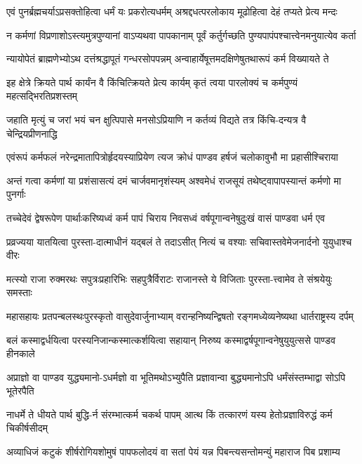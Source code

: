 \twolineshloka
{एवं पुनर्ब्रह्मचर्याऽप्रसक्तोहित्वा धर्मं यः प्रकरोत्यधर्मम्}
{अश्रद्दधत्परलोकाय मूढोहित्वा देहं तप्यते प्रेत्य मन्दः}


\twolineshloka
{न कर्मणां विप्रणाशोऽस्त्यमुत्रपुण्यानां वाऽप्यथवा पापकानाम्}
{पूर्वं कर्तुर्गच्छति पुण्यपापंपश्चात्त्वेनमनुयात्येव कर्ता}


\twolineshloka
{न्यायोपेतं ब्राह्मणेभ्योऽथ दत्तंश्रद्धापूतं गन्धरसोपपन्नम्}
{अन्वाहार्येषूत्तमदक्षिणेषुतथारूपं कर्म विख्यायते ते}


\twolineshloka
{इह क्षेत्रे क्रियते पार्थ कार्यंन वै किंचित्क्रियते प्रेत्य कार्यम्}
{कृतं त्वया पारलोक्यं च कर्मपुण्यं महत्सद्भिरतिप्रशस्तम्}


\twolineshloka
{जहाति मृत्युं च जरां भयं चन क्षुत्पिपासे मनसोऽप्रियाणि}
{न कर्तव्यं विद्यते तत्र किंचि-दन्यत्र वै चेन्द्रियप्रीणनाद्धि}


\twolineshloka
{एवंरूपं कर्मफलं नरेन्द्रमातापित्रोर्हृदयस्याप्रियेण}
{त्यज क्रोधं पाण्डव हर्षजं चलोकावुभौ मा प्रहासीश्चिराया}


\twolineshloka
{अन्तं गत्वा कर्मणां या प्रशंसासत्यं दमं चार्जवमानृशंस्यम्}
{अश्वमेधं राजसूयं तथेष्ट्वापापस्यान्तं कर्मणो मा पुनर्गाः}


\twolineshloka
{तच्चेदेवं द्वेषरूपेण पार्थाःकरिष्यध्वं कर्म पापं चिराय}
{निवसध्वं वर्षपूगान्वनेषुदुःखं वासं पाण्डवा धर्म एव}


\twolineshloka
{प्रव्रज्यया यातयित्वा पुरस्ता-दात्माधीनं यद्बलं ते तदाऽसीत्}
{नित्यं च वश्याः सचिवास्तवेमेजनार्दनो युयुधाश्च वीरः}


\twolineshloka
{मत्स्यो राजा रुक्मरथः सपुत्रःप्रहारिभिः सहपुत्रैर्विराटः}
{राजानस्ते ये विजिताः पुरस्ता-त्त्वामेव ते संश्रयेयुः समस्ताः}


\twolineshloka
{महासहायः प्रतपन्बलस्थःपुरस्कृतो वासुदेवार्जुनाभ्याम्}
{वरान्हनिष्यन्द्विषतो रङ्गमध्येव्यनेष्यथा धार्तराष्ट्रस्य दर्पम्}


\twolineshloka
{बलं कस्माद्वर्धयित्वा परस्यनिजान्कस्मात्कर्शयित्वा सहायान्}
{निरुष्य कस्माद्वर्षपूगान्वनेषुयुयुत्ससे पाण्डव हीनकाले}


\twolineshloka
{अप्राज्ञो वा पाण्डव युद्ध्यमानो-ऽधर्मज्ञो वा भूतिमथोऽभ्युपैति}
{प्रज्ञावान्वा बुद्ध्यमानोऽपि धर्मंसंस्तम्भाद्वा सोऽपि भूतेरपैति}


\twolineshloka
{नाधर्मे ते धीयते पार्थ बुद्धि-र्न संरम्भात्कर्म चकर्थ पापम्}
{आत्थ किं तत्कारणं यस्य हेतोःप्रज्ञाविरुद्धं कर्म चिकीर्षसीदम्}


\twolineshloka
{अव्याधिजं कटुकं शीर्षरोगियशोमुषं पापफलोदयं वा}
{सतां पेयं यन्न पिबन्त्यसन्तोमन्युं महाराज पिब प्रशाम्य}


